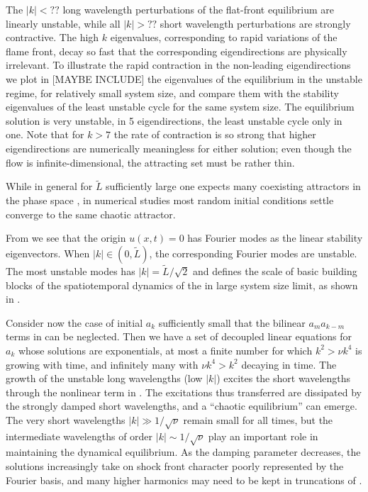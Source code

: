 The $|k|<??$ 
long wavelength perturbations of the flat-front equilibrium
are linearly unstable, while all 
$|k|> ??$ short wavelength perturbations are strongly contractive.  
The high $k$ eigenvalues, corresponding to rapid variations of
the flame front, decay so fast that the corresponding eigendirections
are physically irrelevant.
To illustrate the rapid contraction in the non-leading eigendirections
we plot  in [MAYBE INCLUDE] %
the eigenvalues of the equilibrium in the unstable regime,
for relatively small system size, %
and compare them with the
stability eigenvalues of the least unstable cycle for the same 
system size.
The equilibrium solution is very unstable,
in 5 eigendirections,
the least unstable cycle only in one. 
Note that for $k>7$ the rate of contraction
is so strong that higher eigendirections are numerically meaningless for 
either solution; even though the flow is infinite-dimensional, the attracting
set must be rather thin.

While in general
for $\tilde{L}$ sufficiently large
one expects many 
coexisting attractors in the phase space%
 ,
in numerical studies most random initial
conditions settle converge to the same chaotic attractor. 

From  we see that the origin $u(x,t) = 0$
has Fourier modes as the  linear
stability eigenvectors. 
When $|k| \in (0,\tilde{L})$, the corresponding Fourier modes are
unstable.
The most unstable modes has $|k|=\tilde{L}/\sqrt{2}$ and defines the scale of basic building
blocks of the spatiotemporal dynamics of the {\KSe} in large system size limit,
as shown in . 


\noindent
Consider now the case of initial $a_k$ sufficiently small
that the bilinear $ a_m a_{k-m}$ terms in  can
be neglected. Then we have a set of decoupled linear
equations for $a_k$ whose solutions are exponentials, at most
a finite number for  which
$k^2 > \nu k^4$
is growing with time, and infinitely many with
$
\nu k^4 > k^2
$
decaying in time.
The growth of the unstable long wavelengths (low $|k|$) excites
the short wavelengths
through the nonlinear term in .  The excitations thus
transferred are dissipated by the strongly damped short wavelengths,
and a ``chaotic equilibrium'' can emerge. The very short
wavelengths $|k| \gg 1 / \sqrt{\nu}$ remain small for all times,
but the intermediate wavelengths of order $|k| \sim 1 / \sqrt{\nu}$
play an important role in maintaining the dynamical equilibrium.
As the damping parameter decreases, the solutions increasingly take on
shock front
character poorly represented by the Fourier basis, and many
higher harmonics may need to be kept
in truncations of
.


